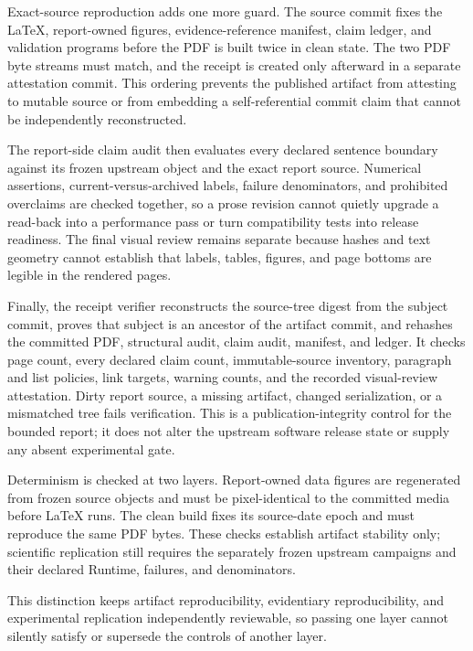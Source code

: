 Exact-source reproduction adds one more guard. The source commit fixes the
LaTeX, report-owned figures, evidence-reference manifest, claim ledger, and
validation programs before the PDF is built twice in clean state. The two
PDF byte streams must match, and the receipt is created only afterward in a
separate attestation commit. This ordering prevents the published artifact
from attesting to mutable source or from embedding a self-referential commit
claim that cannot be independently reconstructed.

The report-side claim audit then evaluates every declared sentence boundary
against its frozen upstream object and the exact report source. Numerical
assertions, current-versus-archived labels, failure denominators, and prohibited
overclaims are checked together, so a prose revision cannot quietly upgrade a
read-back into a performance pass or turn compatibility tests into release
readiness. The final visual review remains separate because hashes and text
geometry cannot establish that labels, tables, figures, and page bottoms are
legible in the rendered pages.

Finally, the receipt verifier reconstructs the source-tree digest from the
subject commit, proves that subject is an ancestor of the artifact commit, and
rehashes the committed PDF, structural audit, claim audit, manifest, and
ledger. It checks page count, every declared claim count, immutable-source
inventory, paragraph and list policies, link targets, warning counts, and the
recorded visual-review attestation. Dirty report source, a missing artifact,
changed serialization, or a mismatched tree fails verification. This is a
publication-integrity control for the bounded report; it does not alter the
upstream software release state or supply any absent experimental gate.

Determinism is checked at two layers. Report-owned data figures are
regenerated from frozen source objects and must be pixel-identical to the
committed media before LaTeX runs. The clean build fixes its source-date
epoch and must reproduce the same PDF bytes. These checks establish artifact
stability only; scientific replication still requires the separately frozen
upstream campaigns and their declared Runtime, failures, and denominators.

This distinction keeps artifact reproducibility, evidentiary reproducibility,
and experimental replication independently reviewable, so passing one layer
cannot silently satisfy or supersede the controls of another layer.

